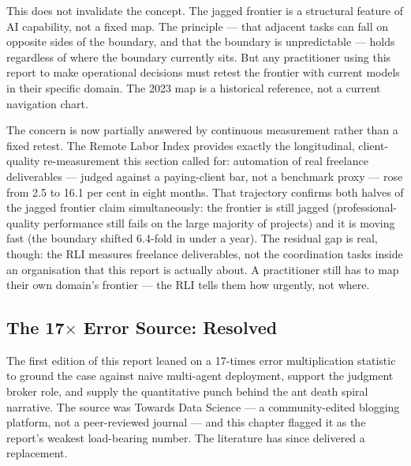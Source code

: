 This does not invalidate the concept. The jagged frontier is a structural feature of AI capability, not a fixed map. The principle --- that adjacent tasks can fall on opposite sides of the boundary, and that the boundary is unpredictable --- holds regardless of where the boundary currently sits. But any practitioner using this report to make operational decisions must retest the frontier with current models in their specific domain. The 2023 map is a historical reference, not a current navigation chart.

The concern is now partially answered by continuous measurement rather than a fixed retest. The Remote Labor Index \parencite{RLI2025, CAIS2026RLI} provides exactly the longitudinal, client-quality re-measurement this section called for: automation of real freelance deliverables --- judged against a paying-client bar, not a benchmark proxy --- rose from 2.5 to 16.1 per cent in eight months. That trajectory confirms both halves of the jagged frontier claim simultaneously: the frontier is still jagged (professional-quality performance still fails on the large majority of projects) and it is moving fast (the boundary shifted 6.4-fold in under a year). The residual gap is real, though: the RLI measures freelance deliverables, not the coordination tasks inside an organisation that this report is actually about. A practitioner still has to map their own domain's frontier --- the RLI tells them how urgently, not where.

\subsection{The 17$\times$ Error Source: Resolved}

The first edition of this report leaned on a 17-times error multiplication statistic \parencite{TDS2026} to ground the case against naive multi-agent deployment, support the judgment broker role, and supply the quantitative punch behind the ant death spiral narrative. The source was Towards Data Science --- a community-edited blogging platform, not a peer-reviewed journal --- and this chapter flagged it as the report's weakest load-bearing number. The literature has since delivered a replacement.

